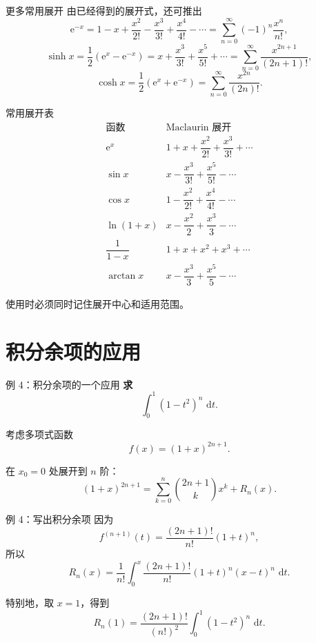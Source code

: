 \documentclass[aspectratio=169,11pt]{ctexbeamer}
\newcommand{\dd}{\,\mathrm{d}}
\newcommand{\ee}{\mathrm{e}}
\begin{document}
\begin{frame}{更多常用展开}
\small
由已经得到的展开式，还可推出
\[
  \ee^{-x}
  =
  1-x+\frac{x^2}{2!}-\frac{x^3}{3!}
  +\frac{x^4}{4!}-\cdots
  =
  \sum_{n=0}^{\infty}(-1)^n\frac{x^n}{n!},
\]
\[
  \sinh x
  =
  \frac12(\ee^x-\ee^{-x})
  =
  x+\frac{x^3}{3!}+\frac{x^5}{5!}+\cdots
  =
  \sum_{n=0}^{\infty}\frac{x^{2n+1}}{(2n+1)!},
\]
\[
  \cosh x
  =
  \frac12(\ee^x+\ee^{-x})
  =
  \sum_{n=0}^{\infty}\frac{x^{2n}}{(2n)!}.
\]
\end{frame}

\begin{frame}{常用展开表}
\footnotesize
\[
\begin{array}{c|c}
\text{函数} & \text{Maclaurin 展开}\\
\hline
\ee^x &
1+x+\dfrac{x^2}{2!}+\dfrac{x^3}{3!}+\cdots\\[0.6em]
\sin x &
x-\dfrac{x^3}{3!}+\dfrac{x^5}{5!}-\cdots\\[0.6em]
\cos x &
1-\dfrac{x^2}{2!}+\dfrac{x^4}{4!}-\cdots\\[0.6em]
\ln(1+x) &
x-\dfrac{x^2}{2}+\dfrac{x^3}{3}-\cdots\\[0.6em]
\dfrac1{1-x} &
1+x+x^2+x^3+\cdots\\[0.6em]
\arctan x &
x-\dfrac{x^3}{3}+\dfrac{x^5}{5}-\cdots
\end{array}
\]

使用时必须同时记住展开中心和适用范围。
\end{frame}

\section{积分余项的应用}

\begin{frame}{例 4：积分余项的一个应用}
\small
\textbf{求}
\[
  \int_0^1(1-t^2)^n\,\dd t.
\]

考虑多项式函数
\[
  f(x)=(1+x)^{2n+1}.
\]

在 $x_0=0$ 处展开到 $n$ 阶：
\[
  (1+x)^{2n+1}
  =
  \sum_{k=0}^n\binom{2n+1}{k}x^k+R_n(x).
\]
\end{frame}

\begin{frame}{例 4：写出积分余项}
\small
因为
\[
  f^{(n+1)}(t)=\frac{(2n+1)!}{n!}(1+t)^n,
\]
所以
\[
  R_n(x)
  =
  \frac1{n!}\int_0^x
  \frac{(2n+1)!}{n!}(1+t)^n(x-t)^n\,\dd t.
\]

特别地，取 $x=1$，得到
\[
  R_n(1)=
  \frac{(2n+1)!}{(n!)^2}
  \int_0^1(1-t^2)^n\,\dd t.
\]
\end{frame}
\end{document}
